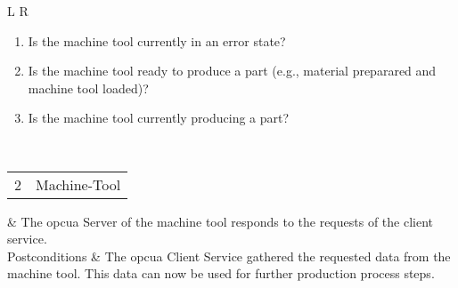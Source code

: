 \documentclass[
a4paper,
twoside,
headsepline,
cleardoublepage=empty,
parskip=half,
draft=false
]{scrbook}
\begin{document}
\begin{table}[hbtp]
\begin{tabular}{L R}
\begin{enumerate}
							\item Is the machine tool currently in an error state?
							\item Is the machine tool ready to produce a part (e.g., material preparared and machine tool loaded)?
							\item Is the machine tool currently producing a part?
						\end{enumerate}
						\\ \midrule
						\begin{tabular}{c c} 2 & Machine-Tool \end{tabular} & The \gls{opcua} Server of the machine tool responds to the requests of the client service.
						\\ \midrule
						Postconditions & The \gls{opcua} Client Service gathered the requested data from the machine tool. This data can now be used for further production process steps.
						\\ \bottomrule
					\end{tabular}
				\end{table}
\end{document}
